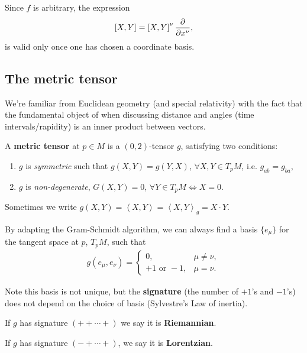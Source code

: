 Since $f$ is arbitrary, the expression
\begin{align}
    \left[ X, Y \right] = \left[ X, Y \right]^{\nu} \pdv{x^{\nu}}
,\end{align}
is valid only once one has chosen a coordinate basis.

\subsection{The metric tensor}

We're familiar from Euclidean geometry (and special relativity) with the fact that the fundamental object of when discussing distance and angles (time intervals/rapidity) is an inner product between vectors.

\begin{definition}
    A \textbf{metric tensor} at $p \in M$ is a $\left( 0,2 \right)$-tensor $g$, satisfying two conditions:
    \begin{enumerate}[label=\roman*)]
        \item $g$ is \textit{symmetric} such that $g \left( X,Y \right) = g\left( Y,X \right) $, $\forall X,Y \in T_p M$, i.e. $g_{ab} = g_{ba}$,
        \item $g$ is \textit{non-degenerate}, $G\left( X,Y \right) = 0 $, $\forall Y \in T_p M \iff X = 0$.
    \end{enumerate}
\end{definition}

Sometimes we write $g\left( X,Y \right) = \left<X,Y \right> = \left<X,Y \right>_g = X \cdot Y$.

By adapting the Gram-Schmidt algorithm, we can always find a basis $\{e_{\mu}\} $ for the tangent space at $p$, $T_p M$, such that
\begin{align}
    g \left( e_{\mu}, e_{\nu} \right) = \begin{cases}
        0, & \mu \neq \nu, \\
        +1 \text{~or~}-1, & \mu = \nu.
    \end{cases}
\end{align}

Note this basis is not unique, but the \textbf{signature} (the number of $+1$'s and $-1$'s) does not depend on the choice of basis (Sylvestre's Law of inertia).

If $g$ has signature $\left( + +\cdots + \right) $ we say it is \textbf{Riemannian}.

If $g$ has signature $\left( - + \cdots + \right) $, we say it is \textbf{Lorentzian}.

